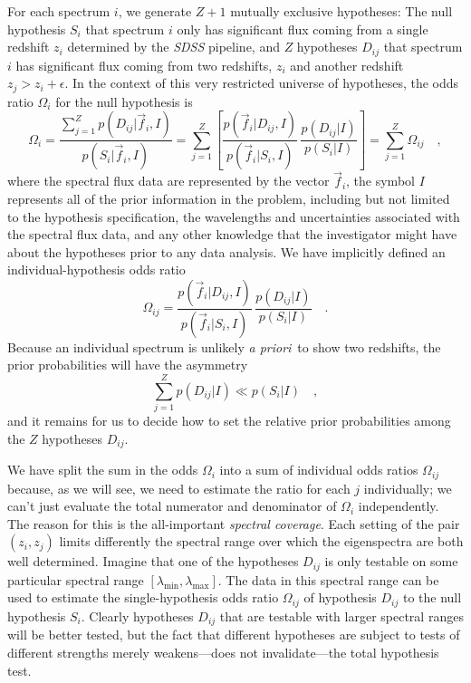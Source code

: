 \documentclass[12pt]{article}
\newcommand{\facility}[1]{\textsl{#1}}
\newcommand{\foreign}[1]{\textsl{#1}}
\newcommand{\apriori}{\foreign{a priori}}
\newcommand{\fluxvec}{\vec{f}}
\begin{document}
For each spectrum $i$, we generate $Z+1$ mutually exclusive hypotheses:
The null hypothesis $S_i$ that spectrum $i$ only has significant flux
coming from a single redshift $z_i$ determined by the \facility{SDSS}
pipeline, and $Z$ hypotheses $D_{ij}$ that spectrum $i$ has significant
flux coming from two redshifts, $z_i$ and another redshift
$z_j>z_i+\epsilon$.  In the context of this very restricted universe
of hypotheses, the odds ratio $\Omega_i$ for the null hypothesis is
\begin{equation}\label{eq:odds}
\Omega_i = \frac{\sum_{j=1}^Z p(D_{ij}|\fluxvec_i,I)}{p(S_i|\fluxvec_i,I)}
 = \sum_{j=1}^Z \left[\frac{p(\fluxvec_i|D_{ij},I)}{p(\fluxvec_i|S_i,I)}
 \,\frac{p(D_{ij}|I)}{p(S_i|I)}\right] = \sum_{j=1}^Z\Omega_{ij}\quad,
\end{equation}
where the spectral flux data are represented by the vector
$\fluxvec_i$, the symbol $I$ represents all of the prior information
in the problem, including but not limited to the hypothesis
specification, the wavelengths and uncertainties associated with the
spectral flux data, and any other knowledge that the investigator
might have about the hypotheses prior to any data analysis.  We have
implicitly defined an individual-hypothesis odds ratio
\begin{equation}
\Omega_{ij} = \frac{p(\fluxvec_i|D_{ij},I)}{p(\fluxvec_i|S_i,I)}
  \,\frac{p(D_{ij}|I)}{p(S_i|I)}\quad.
\end{equation}
Because an individual spectrum is unlikely \apriori\ to show two
redshifts, the prior probabilities will have the asymmetry
\begin{equation}
\sum_{j=1}^Z p(D_{ij}|I) \ll p(S_i|I) \quad,
\end{equation}
and it remains for us to decide how to set the relative prior
probabilities among the $Z$ hypotheses $D_{ij}$.

We have split the sum in the odds $\Omega_i$ into a sum of individual
odds ratios $\Omega_{ij}$ because, as we will see, we need to estimate
the ratio for each $j$ individually; we can't just evaluate the total
numerator and denominator of $\Omega_i$ independently.  The reason for
this is the all-important \emph{spectral coverage}.  Each setting of
the pair $(z_i,z_j)$ limits differently the spectral range over which
the eigenspectra are both well determined.  Imagine that one of the
hypotheses $D_{ij}$ is only testable on some particular spectral range
$[\lambda_{\min},\lambda_{\max}]$.  The data in this spectral range
can be used to estimate the single-hypothesis odds ratio $\Omega_{ij}$
of hypothesis $D_{ij}$ to the null hypothesis $S_i$.  Clearly
hypotheses $D_{ij}$ that are testable with larger spectral ranges will
be better tested, but the fact that different hypotheses are subject
to tests of different strengths merely weakens---does not
invalidate---the total hypothesis test.
\end{document}
